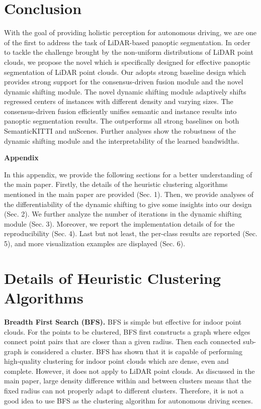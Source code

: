 \documentclass[final]{cvpr}
\begin{document}
\section{Conclusion}
With the goal of providing holistic perception for autonomous driving, we are one of the first to address the
task of LiDAR-based panoptic segmentation.
In order to tackle the challenge brought by the non-uniform distributions of LiDAR point clouds, we propose the
novel \nickname{} which is specifically designed for effective panoptic segmentation of LiDAR point clouds.
Our \nickname{} adopts strong baseline design which provides strong support for the consensus-driven fusion module
and the novel dynamic shifting module.
The novel dynamic shifting module adaptively shifts regressed centers of instances with different density and varying sizes.
The consensus-driven fusion efficiently unifies semantic and instance results into panoptic segmentation results.
The \nickname{} outperforms all strong baselines on both SemanticKITTI and nuScenes.
Further analyses show the robustness of the dynamic shifting module and the interpretability of the learned bandwidths.

 


{\small
    
    
}

\clearpage

\setcounter{section}{0}

\begin{center}
 {\large \textbf{Appendix}}
\end{center}

In this appendix, we provide the following sections for a better understanding of the main paper.
Firstly, the details of the heuristic clustering algorithms mentioned in the main paper are provided (Sec. 1).
Then, we provide analyses of the differentiability of the dynamic shifting to give some insights into our design (Sec. 2).
We further analyze the number of iterations in the dynamic shifting module (Sec. 3).
Moreover, we report the implementation details of \nickname{} for the reproducibility (Sec. 4).
Last but not least, the per-class results are reported (Sec. 5), and more visualization examples are displayed (Sec. 6).

\section{Details of Heuristic Clustering Algorithms} \label{sec:1}
\noindent\textbf{Breadth First Search (BFS).}
BFS is simple but effective for indoor point clouds.
For the points to be clustered, BFS first constructs a graph where edges connect point
pairs that are closer than a given radius.
Then each connected sub-graph is considered a cluster.
BFS has shown that it is capable of performing high-quality clustering for
indoor point clouds \cite{jiang2020pointgroup} which are dense, even and complete.
However, it does not apply to LiDAR point clouds.
As discussed in the main paper, large density difference within and between clusters means that the fixed radius can
not properly adapt to different clusters.
Therefore, it is not a good idea to use BFS as the clustering algorithm for autonomous driving scenes.
\end{document}

